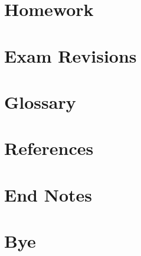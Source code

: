 \documentclass[10pt]{article}
\begin{document}
\thispagestyle{empty}


\clearpage

\thispagestyle{empty}

\tableofcontents

\clearpage
\pagebreak

\thispagestyle{fancy}

\section{Homework}


\section{Exam Revisions}


\section{Glossary}


\section{References}


\section{End Notes}


\section{Bye}


\end{document}
